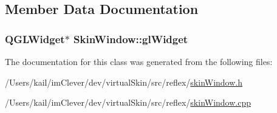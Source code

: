 \subsection{Member Data Documentation}
\hypertarget{class_skin_window_adc8cd91eda08e26104717957c37bccc0}{
\subsubsection[{glWidget}]{\setlength{\rightskip}{0pt plus 5cm}QGLWidget$\ast$ {\bf SkinWindow::glWidget}}}
\label{class_skin_window_adc8cd91eda08e26104717957c37bccc0}


The documentation for this class was generated from the following files:\begin{DoxyCompactItemize}
\item 
/Users/kail/imClever/dev/virtualSkin/src/reflex/\hyperlink{skin_window_8h}{skinWindow.h}\item 
/Users/kail/imClever/dev/virtualSkin/src/reflex/\hyperlink{skin_window_8cpp}{skinWindow.cpp}\end{DoxyCompactItemize}
